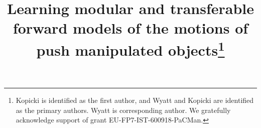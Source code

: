 %
%
%
%
%
%
\RequirePackage{fix-cm}
%
\documentclass[natbib,twocolumn]{svjour3}          %
%
\smartqed  %
%
\usepackage{graphicx}
%
%
\usepackage{amsmath,amssymb,amsbsy}
\usepackage{algorithm}
\usepackage{graphicx}
\usepackage{epstopdf}
\usepackage{algorithmic}
\usepackage{stackengine}

%
\newcommand{\Ex}{\mathop{\mathbb E\/}}
\newcommand{\argmax}[1]{\underset{#1}{\operatorname{argmax}}\medspace}

%


\title{Learning modular and transferable forward models of the motions of push manipulated objects\thanks{Kopicki is identified as the first author, and Wyatt and Kopicki are identified as the primary authors. Wyatt is corresponding author. We gratefully acknowledge support of grant EU-FP7-IST-600918-PaCMan.}
}

